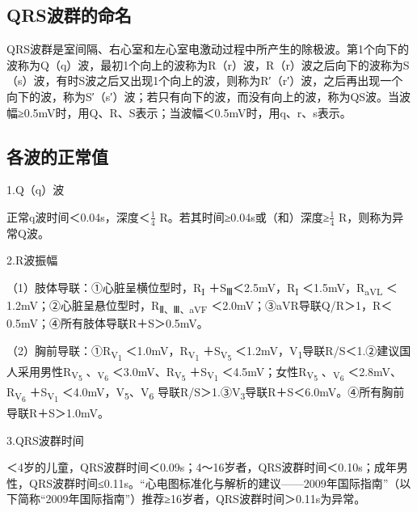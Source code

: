 \protect\hypertarget{text00009.htmlux5cux23subid36}{}{}

\subsection{QRS波群的命名}

QRS波群是室间隔、右心室和左心室电激动过程中所产生的除极波。第1个向下的波称为Q（q）波，最初1个向上的波称为R（r）波，R（r）波之后向下的波称为S（s）波，有时S波之后又出现1个向上的波，则称为R′（r′）波，之后再出现一个向下的波，称为S′（s′）波；若只有向下的波，而没有向上的波，称为QS波。当波幅≥0.5mV时，用Q、R、S表示；当波幅＜0.5mV时，用q、r、s表示。

\protect\hypertarget{text00009.htmlux5cux23subid37}{}{}

\subsection{各波的正常值}

1.Q（q）波

正常q波时间＜0.04s，深度＜$\frac{1}{4}$
R。若其时间≥0.04s或（和）深度≥$\frac{1}{4}$
R，则称为异常Q波。

2.R波振幅

（1）肢体导联：①心脏呈横位型时，R\textsubscript{I} ＋S\textsubscript{Ⅲ}＜2.5mV，R\textsubscript{I} ＜1.5mV，R\textsubscript{aVL}
＜1.2mV；②心脏呈悬位型时，R\textsubscript{Ⅱ、Ⅲ、aVF}
＜2.0mV；③aVR导联Q/R＞1，R＜0.5mV；④所有肢体导联R＋S＞0.5mV。

（2）胸前导联：①R\textsubscript{V\textsubscript{1}}
＜1.0mV，R\textsubscript{V\textsubscript{1}}
＋S\textsubscript{V\textsubscript{5}} ＜1.2mV，V\textsubscript{1}导联R/S＜1.②建议国人采用男性R\textsubscript{V\textsubscript{5}}
、\textsubscript{V\textsubscript{6}}
＜3.0mV、R\textsubscript{V\textsubscript{5}}
＋S\textsubscript{V\textsubscript{1}}
＜4.5mV；女性R\textsubscript{V\textsubscript{5}}
、\textsubscript{V\textsubscript{6}}
＜2.8mV、R\textsubscript{V\textsubscript{6}}
＋S\textsubscript{V\textsubscript{1}} ＜4.0mV，V\textsubscript{5}、V\textsubscript{6} 导联R/S＞1.③V\textsubscript{3}导联R＋S＜6.0mV。④所有胸前导联R＋S＞1.0mV。

3.QRS波群时间

＜4岁的儿童，QRS波群时间＜0.09s；4～16岁者，QRS波群时间＜0.10s；成年男性，QRS波群时间≤0.11s。“心电图标准化与解析的建议------2009年国际指南”（以下简称“2009年国际指南”）推荐≥16岁者，QRS波群时间＞0.11s为异常。

\protect\hypertarget{text00009.htmlux5cux23subid38}{}{}

